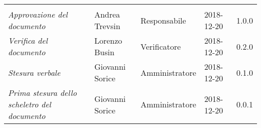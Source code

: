 \newpage 
\section*{}
\begin{table}[H]
	\centering
	\begin{tabular}{p{4cm}|C{3cm}|C{3cm}|R{2.5cm}|R{2cm}}
		
		 & & & & \\
		
		
		\emph{Approvazione del documento} &  Andrea Trevsin & Responsabile & 2018-12-20 & 1.0.0 \\
		\hline
		
		\emph{Verifica del documento} & Lorenzo Busin & Verificatore & 2018-12-20 & 0.2.0 \\
		\hline

		\emph{Stesura verbale} & Giovanni Sorice & Amministratore & 2018-12-20 & 0.1.0 \\
		\hline
		
		\emph{Prima stesura dello scheletro del documento} & Giovanni Sorice & Amministratore & 2018-12-20 & 0.0.1 \\
		
	\end{tabular}
	
\end{table}


\clearpage